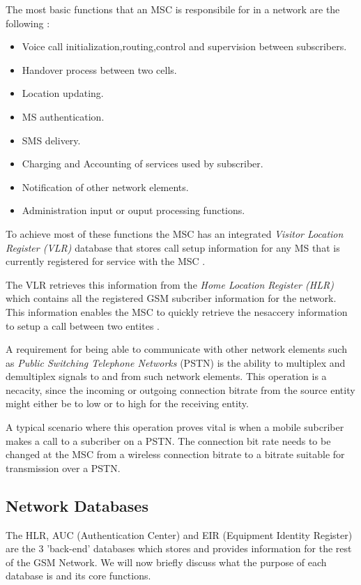 The most basic functions that an MSC is responsibile for in a network are the following \cite{wirelesstelcoMullet}:
\begin{itemize}
\item Voice call initialization,routing,control and supervision between subscribers.
\item Handover process between two cells.
\item Location updating.
\item MS authentication.
\item SMS delivery.
\item Charging and Accounting of services used by subscriber.
\item Notification of other network elements.
\item Administration input or ouput processing functions.
\end{itemize}

To achieve most of these functions the MSC has an integrated \emph{Visitor Location Register (VLR)} database that stores call setup information for any MS that is currently registered for service with the MSC \cite{GSM92,wirelesstelcoMullet}. 

The VLR retrieves this information from the \emph{Home Location Register (HLR)} which contains all the registered GSM subcriber information for the network. This information enables the MSC to quickly retrieve the nesaccery information to setup a call between two entites \cite{GSMSysEngin,GSMSecurInTeleNetwork}.

A requirement for being able to communicate with other network elements such as \emph{Public Switching Telephone Networks} (PSTN) is the ability to multiplex and demultiplex signals to and from such network elements. This operation is a necacity, since the incoming or outgoing connection bitrate from the source entity might either be to low or to high for the receiving entity.

A typical scenario where this operation proves vital is when a mobile subcriber makes a call to a subcriber on a PSTN. The connection bit rate needs to be changed at the MSC from a wireless connection bitrate to a bitrate suitable for transmission over a PSTN.

\subsection{Network Databases}
The HLR, AUC (Authentication Center) and EIR (Equipment Identity Register) are the 3 'back-end' databases which stores and provides information for the rest of the GSM Network. We will now briefly discuss what the purpose of each database is and its core functions.

